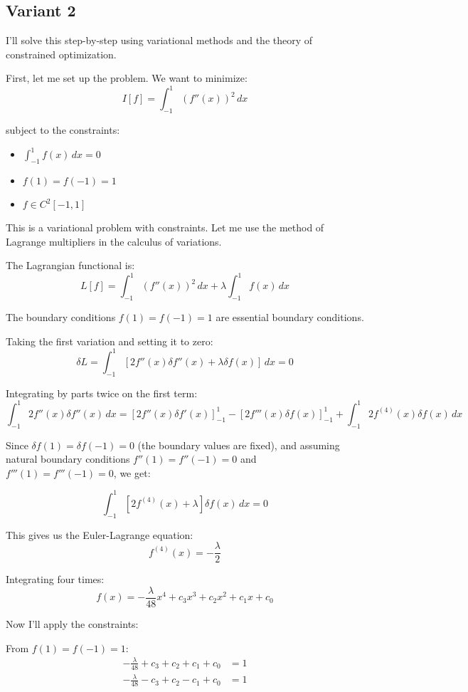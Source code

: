 \documentclass[12pt,a4paper]{article}
\theoremstyle{definition}
\begin{document}
\subsection{Variant 2}
        I'll solve this step-by-step using variational methods and the theory of constrained optimization.

        First, let me set up the problem. We want to minimize:
        $$I[f] = \int_{-1}^{1} (f''(x))^2 \, dx$$

        subject to the constraints:
        \begin{itemize}
            \item $\int_{-1}^{1} f(x) \, dx = 0$
            \item $f(1) = f(-1) = 1$
            \item $f \in C^2[-1,1]$
        \end{itemize}

        This is a variational problem with constraints. Let me use the method of Lagrange multipliers in the calculus of variations.

        The Lagrangian functional is:
        $$L[f] = \int_{-1}^{1} (f''(x))^2 \, dx + \lambda \int_{-1}^{1} f(x) \, dx$$

        The boundary conditions $f(1) = f(-1) = 1$ are essential boundary conditions.

        Taking the first variation and setting it to zero:
        $$\delta L = \int_{-1}^{1} [2f''(x)\delta f''(x) + \lambda \delta f(x)] \, dx = 0$$

        Integrating by parts twice on the first term:
        $$\int_{-1}^{1} 2f''(x)\delta f''(x) \, dx = [2f''(x)\delta f'(x)]_{-1}^{1} - [2f'''(x)\delta f(x)]_{-1}^{1} + \int_{-1}^{1} 2f^{(4)}(x)\delta f(x) \, dx$$

        Since $\delta f(1) = \delta f(-1) = 0$ (the boundary values are fixed), and assuming natural boundary conditions $f''(1) = f''(-1) = 0$ and $f'''(1) = f'''(-1) = 0$, we get:

        $$\int_{-1}^{1} [2f^{(4)}(x) + \lambda] \delta f(x) \, dx = 0$$

        This gives us the Euler-Lagrange equation:
        $$f^{(4)}(x) = -\frac{\lambda}{2}$$

        Integrating four times:
        $$f(x) = -\frac{\lambda}{48}x^4 + c_3 x^3 + c_2 x^2 + c_1 x + c_0$$

        Now I'll apply the constraints:

        From $f(1) = f(-1) = 1$:
        \begin{align}
            -\frac{\lambda}{48} + c_3 + c_2 + c_1 + c_0 &= 1\\
            -\frac{\lambda}{48} - c_3 + c_2 - c_1 + c_0 &= 1
        \end{align}
\end{document}

